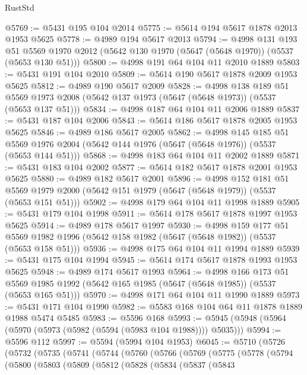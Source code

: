 \begin{lexlean}{RustStd}
\begin{coremodule}
@5769 := @5431 @195 @104 @2014
@5775 := @5614 @194 @5617 @1878 @2013 @1953 @5625
@5778 := @4989 @194 @5617 @2013
@5794 := @4998
    @131
    @193
    @51
    @5569
    @1970
    @2012
    (@5642 @130 @1970 (@5647 (@5648 @1970)) (@5537 (@5653 @130 @51)))
@5800 := @4998 @191 @64 @104 @11 @2010 @1889
@5803 := @5431 @191 @104 @2010
@5809 := @5614 @190 @5617 @1878 @2009 @1953 @5625
@5812 := @4989 @190 @5617 @2009
@5828 := @4998
    @138
    @189
    @51
    @5569
    @1973
    @2008
    (@5642 @137 @1973 (@5647 (@5648 @1973)) (@5537 (@5653 @137 @51)))
@5834 := @4998 @187 @64 @104 @11 @2006 @1889
@5837 := @5431 @187 @104 @2006
@5843 := @5614 @186 @5617 @1878 @2005 @1953 @5625
@5846 := @4989 @186 @5617 @2005
@5862 := @4998
    @145
    @185
    @51
    @5569
    @1976
    @2004
    (@5642 @144 @1976 (@5647 (@5648 @1976)) (@5537 (@5653 @144 @51)))
@5868 := @4998 @183 @64 @104 @11 @2002 @1889
@5871 := @5431 @183 @104 @2002
@5877 := @5614 @182 @5617 @1878 @2001 @1953 @5625
@5880 := @4989 @182 @5617 @2001
@5896 := @4998
    @152
    @181
    @51
    @5569
    @1979
    @2000
    (@5642 @151 @1979 (@5647 (@5648 @1979)) (@5537 (@5653 @151 @51)))
@5902 := @4998 @179 @64 @104 @11 @1998 @1889
@5905 := @5431 @179 @104 @1998
@5911 := @5614 @178 @5617 @1878 @1997 @1953 @5625
@5914 := @4989 @178 @5617 @1997
@5930 := @4998
    @159
    @177
    @51
    @5569
    @1982
    @1996
    (@5642 @158 @1982 (@5647 (@5648 @1982)) (@5537 (@5653 @158 @51)))
@5936 := @4998 @175 @64 @104 @11 @1994 @1889
@5939 := @5431 @175 @104 @1994
@5945 := @5614 @174 @5617 @1878 @1993 @1953 @5625
@5948 := @4989 @174 @5617 @1993
@5964 := @4998
    @166
    @173
    @51
    @5569
    @1985
    @1992
    (@5642 @165 @1985 (@5647 (@5648 @1985)) (@5537 (@5653 @165 @51)))
@5970 := @4998 @171 @64 @104 @11 @1990 @1889
@5973 := @5431 @171 @104 @1990
@5982 := @5583 @168 @104 @64 @11 @1878 @1889 @1988 @5474 @5485
@5983 := @5596 @168
@5993 := @5945 (@5948 (@5964 (@5970 (@5973 (@5982 (@5594 (@5983 @104 @1988)))) @5035)))
@5994 := @5596 @112
@5997 := @5594 (@5994 @104 @1953)
@6045 := @5710
    (@5726
      (@5732
        (@5735
          (@5741
            (@5744
              (@5760
                (@5766
                  (@5769
                    (@5775
                      (@5778
                        (@5794
                          (@5800
                            (@5803
                              (@5809
                                (@5812
                                  (@5828
                                    (@5834
                                      (@5837
                                        (@5843

\end{coremodule}
\end{lexlean}
